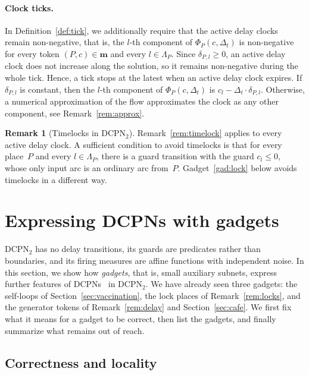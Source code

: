 \documentclass[11pt]{article}
\theoremstyle{definition}
\newcommand{\bfm}{\mathbf{m}}
\newcommand{\DCPN}[1]{\texorpdfstring{\textup{DCPN}\ensuremath{_{#1}}}{DCPN#1}}
\newtheorem{remark}{Remark}
\begin{document}
\paragraph{Clock ticks.}
In Definition~\ref{def:tick}, we additionally require that the active delay
clocks remain non-negative, that is, the $l$-th component of
$\Phi_P(c, \Delta_t)$ is non-negative for every token $(P, c) \in \bfm$ and every
$l \in \Lambda_P$. Since $\delta_{P, l} \ge 0$, an active delay clock does
not increase along the solution, so it remains non-negative during the whole
tick. Hence, a tick stops at the latest when an active delay clock expires.
If $\delta_{P, l}$ is constant, then the $l$-th component of $\Phi_P(c, \Delta_t)$ is
$c_l - \Delta_t \cdot \delta_{P, l}$. Otherwise, a numerical approximation of the
flow approximates the clock as any other component, see
Remark~\ref{rem:approx}.

\begin{remark}[Timelocks in \DCPN{2}]\label{rem:timelock2}
  Remark~\ref{rem:timelock} applies to every active delay clock. A
  sufficient condition to avoid timelocks is that for every place~$P$ and
  every $l \in \Lambda_P$, there is a guard transition with the guard
  $c_l \le 0$, whose only input arc is an ordinary arc from~$P$.
  Gadget~\ref{gad:lock} below avoids timelocks in a different way.
\end{remark}

\section{Expressing DCPNs with gadgets}\label{sec:gadgets}

\DCPN{2} has no delay transitions, its guards are predicates rather than
boundaries, and its firing measures are affine functions with independent
noise. In this section, we show how \emph{gadgets}, that is, small auxiliary
subnets, express further features of DCPNs~\cite{EverdijBlom2005} in
\DCPN{2}. We have already seen three gadgets: the self-loops of
Section~\ref{sec:vaccination}, the lock places of Remark~\ref{rem:locks},
and the generator tokens of Remark~\ref{rem:delay} and
Section~\ref{sec:cafe}. We first fix what it means for a gadget to be
correct, then list the gadgets, and finally summarize what remains out of
reach.

\subsection{Correctness and locality}
\end{document}
